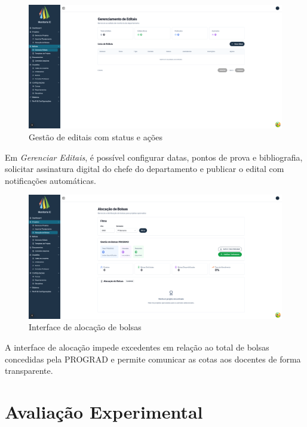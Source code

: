 \documentclass[portuguese]{sbc2025}%
\begin{document}
\begin{figure}[h!]
  \centering
  \includegraphics[width=\linewidth]{images/monitoria/admin-edital-management.png}
  \caption{Gestão de editais com status e ações}
  \label{fig:editais}
\end{figure}

Em \textit{Gerenciar Editais}, é possível configurar datas, pontos de prova e bibliografia, solicitar assinatura digital do chefe do departamento e publicar o edital com notificações automáticas.

\begin{figure}[h!]
  \centering
  \includegraphics[width=\linewidth]{images/monitoria/admin-scholarship-allocation.png}
  \caption{Interface de alocação de bolsas}
  \label{fig:bolsas}
\end{figure}

A interface de alocação impede excedentes em relação ao total de bolsas concedidas pela PROGRAD e permite comunicar as cotas aos docentes de forma transparente.

\section{Avaliação Experimental}
\label{sec:evaluation}
\end{document}
